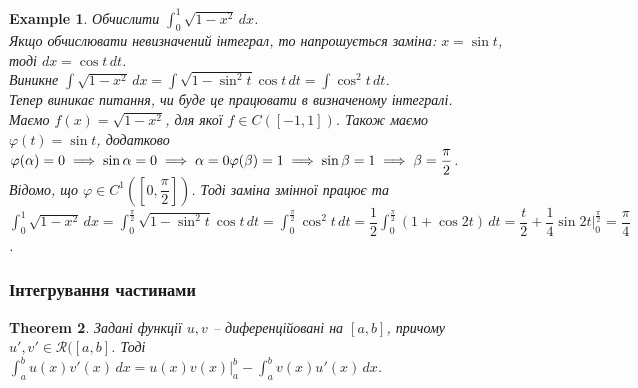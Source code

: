 \documentclass[a4paper, 10pt]{article}
\makeatletter
\def\huge{\displaystyle}
\theoremstyle{theoremdd}
\newtheorem{theorem}{Theorem}[subsection]
\theoremstyle{theoremdd}
\theoremstyle{theoremdd}
\theoremstyle{theoremdd}
\theoremstyle{theoremdd}
\newtheorem{example}[theorem]{Example}
\theoremstyle{theoremdd}
\theoremstyle{theoremdd}
\theoremstyle{theoremdd}
\theoremstyle{theoremdd}
\renewenvironment{proof}[1][Proof.\\]{\par
\pushQED{\hfill \qed}%
\normalfont \topsep6\p@\@plus6\p@\relax
\trivlist
\item\relax
{\bfseries
#1\@addpunct{.}}\hspace\labelsep\ignorespaces
}{%
\popQED\endtrivlist\@endpefalse
}
\makeatother
\begin{document}

\begin{example}
Обчислити $\huge\int_0^1 \sqrt{1-x^2}\,dx$.\\
Якщо обчислювати невизначений інтеграл, то напрошується заміна: $x = \sin t$, тоді $dx = \cos t \,dt$.\\
Виникне $\huge\int \sqrt{1-x^2}\,dx = \int \sqrt{1-\sin^2 t} \cos t\,dt = \int \cos^2 t\,dt$.\\
Тепер виникає питання, чи буде це працювати в визначеному інтегралі.\\
Маємо $f(x) = \sqrt{1-x^2}$, для якої $f \in C([-1,1])$. Також маємо $\varphi(t) = \sin t$, додатково \\
$\varphi(\alpha) = 0 \implies \sin \alpha = 0 \implies \alpha = 0 \\
\varphi(\beta) = 1 \implies \sin \beta = 1 \implies \beta = \dfrac{\pi}{2}$.\\ Відомо, що $\varphi \in C^1\left(\left[0,\dfrac{\pi}{2}\right]\right)$. Тоді заміна змінної працює та\\
$\huge\int_0^1 \sqrt{1-x^2}\,dx = \int_0^{\frac{\pi}{2}} \sqrt{1-\sin^2 t} \cos t \,dt = \int_0^{\frac{\pi}{2}} \cos^2 t\,dt = \dfrac{1}{2} \int_0^{\frac{\pi}{2}} (1+\cos 2t)\,dt = \dfrac{t}{2} + \dfrac{1}{4} \sin 2t \Big|_0^{\frac{\pi}{2}} = \dfrac{\pi}{4}$.
\end{example}

\subsubsection{Інтегрування частинами}
\begin{theorem}
Задані функції $u,v$ -- диференційовані на $[a,b]$, причому $u',v' \in \mathcal{R}([a,b]$. Тоді \\
$\huge\int_a^b u(x)v'(x)\,dx = u(x)v(x) \Big|_a^b - \int_a^b v(x)u'(x)\,dx$.
\end{theorem}
\end{document}
